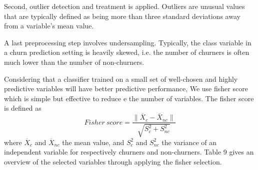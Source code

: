 \documentclass[11pt,onside,a4paper,fleqn]{report}
\renewcommand\arraystretch{2.5}
\begin{document}
\hspace{0.8cm}Second, outlier detection and treatment is applied. Outliers are
unusual values that are typically defined as being more than three
standard deviations away from a variable’s mean value.

\hspace{0.8cm}A last preprocessing step involves undersampling. Typically, the class variable in a churn prediction setting is heavily skewed, i.e.
the number of churners is often much lower than the number of non-churners.

\hspace{0.8cm}Considering that a classifier trained on a small set of well-chosen and highly predictive variables will have better predictive performance, 
We use fisher score which is simple but effective to reduce e the number of variables. The fisher score is defined as
\begin{equation}
          Fisher \  score = \frac{\|\overline{X}_{c} - \overline{X}_{nc}\|}{\sqrt{S_{c}^{2}+S_{nc}^{2}}} 
\end{equation}  
where $\overline{X}_{c}$ and $\overline{X}_{nc}$ the mean value, and $S_{c}^{2}$ and $S_{nc}^{2}$ the variance of an independent variable for respectively churners and non-churners.
Table 9 gives an overview of the selected variables through applying the fisher selection.
\renewcommand\arraystretch{1.2} 
\end{document}
